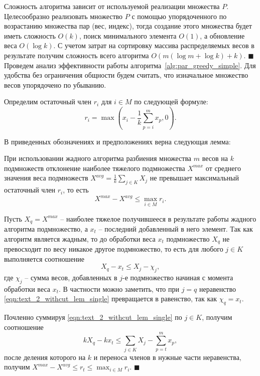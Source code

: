 Сложность алгоритма зависит от используемой реализации множества $P$.
Целесообразно реализовать множество $P$ с помощью упорядоченного по возрастанию множества пар (вес, индекс), тогда создание этого множества будет иметь сложность $O(k)$, поиск минимального элемента $O(1)$, а обновление веса $O(\log k)$.
С учетом затрат на сортировку массива распределяемых весов в результате получим сложность всего алгоритма $O(m (\log m + \log k) + k)$.
$\blacksquare$\\

Проведем анализ эффективности работы алгоритма~\ref{alg:par_greedy_simple}.
Для удобства без ограничения общности будем считать, что изначальное множество весов упорядочено по убыванию.

Определим остаточный член $r_i$ для $i \in M$ по следующей формуле:
\begin{equation}
	r_i = \max{\left( x_i - \frac{1}{k} \sum_{p = i}^{m}{x_p}, 0 \right)}.
\end{equation}

В приведенных обозначениях и предположениях верна следующая лемма:

\begin{lemma}\label{lem:text_2_withcut_lem}
При использовании жадного алгоритма разбиения множества $m$ весов на $k$ подмножеств отклонение наиболее тяжелого подмножества $X^{max}$ от среднего значения веса подмножеств $X^{avg} = \frac{1}{k} \sum_{j \in K}{X_j}$ не превышает максимальный остаточный член $r_i$, то есть
\begin{equation}
	X^{max} - X^{avg} \le \max_{i \in M}{r_i}.
\end{equation}
\end{lemma}
Пусть $X_q = X^{max}$ -- наиболее тяжелое получившееся в результате работы жадного алгоритма подмножество, а $x_t$ -- последний добавленный в него элемент.
Так как алгоритм является жадным, то до обработки веса $x_t$ подмножество $X_q$ не превосходит по весу никакое другое подмножество, то есть для любого $j \in K$ выполняется соотношение
\begin{equation}\label{eqn:text_2_withcut_lem_single}
	X_q - x_t \le X_j - \chi_j,
\end{equation}	
где $\chi_j$ -- сумма весов, добавленных в $j$-е подмножество начиная с момента обработки веса $x_t$.
В частности можно заметить, что при $j = q$ неравенство \eqref{eqn:text_2_withcut_lem_single} превращается в равенство, так как $\chi_q = x_t$.

Почленно суммируя \eqref{eqn:text_2_withcut_lem_single} по $j \in K$, получим соотношение
\begin{equation}
	k X_q - k x_t \le \sum_{j \in K}{X_j} - \sum_{p = t}^{m}{x_p},
\end{equation}
после деления которого на $k$ и переноса членов в нужные части неравенства, получим $X^{max} - X^{avg} \le r_t \le \max_{i \in M}{r_i}$.
$\blacksquare$\\

